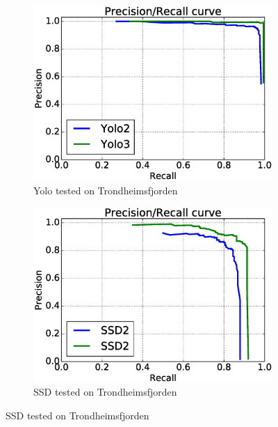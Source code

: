 \begin{figure}[h!]
\begin{subfigure}{.5\textwidth}
  \centering
  \includegraphics[width=0.8\linewidth]{results/case_buildings/prec_recall/yolo/trf.eps}
  \caption{Yolo tested on Trondheimsfjorden}
  \label{fig:sfig1}
\end{subfigure}%
\begin{subfigure}{.5\textwidth}
  \centering
  \includegraphics[width=.8\linewidth]{results/case_buildings/prec_recall/ssd/trf.eps}
  \caption{SSD tested on Trondheimsfjorden}
  \label{fig:sfig2}
\end{subfigure}


\end{figure}
